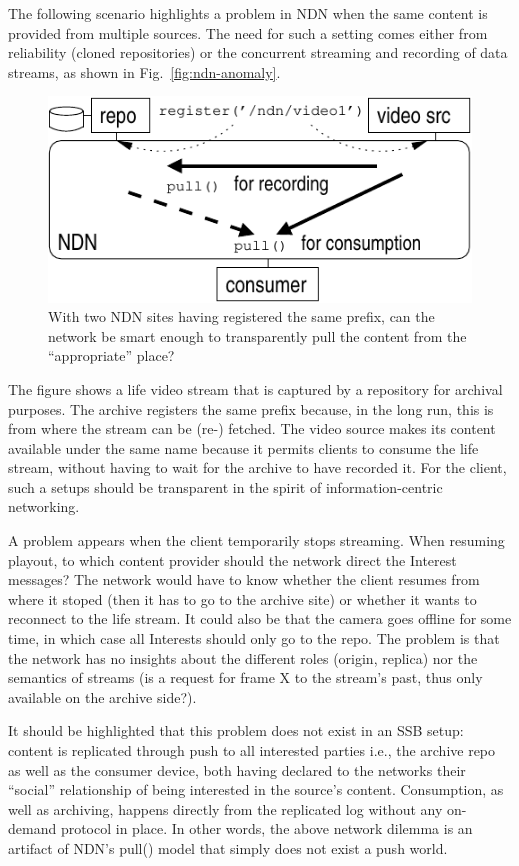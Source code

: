 \documentclass[10pt,sigconf]{acmart}
\begin{document}
The following scenario highlights a problem in NDN when the same
content is provided from multiple sources. The need for such a setting
comes either from reliability (cloned repositories) or the concurrent
streaming and recording of data streams, as shown in
Fig.~\ref{fig:ndn-anomaly}.

\begin{figure}[htb]
  \includegraphics[width=0.7\columnwidth]{figs/ndn-anomaly.pdf}
  \caption{\label{fig:ssb-and-ndn}With two NDN sites having registered
    the same prefix, can the network be smart enough to transparently
    pull the content from the ``appropriate'' place?}
\end{figure}

The figure shows a life video stream that is captured by a repository
for archival purposes. The archive registers the same prefix because,
in the long run, this is from where the stream can be (re-)
fetched. The video source makes its content available under the same
name because it permits clients to consume the life stream, without
having to wait for the archive to have recorded it. For the client,
such a setups should be transparent in the spirit of
information-centric networking.

A problem appears when the client temporarily stops streaming. When
resuming playout, to which content provider should the network direct
the Interest messages? The network would have to know whether the
client resumes from where it stoped (then it has to go to the archive
site) or whether it wants to reconnect to the life stream. It could
also be that the camera goes offline for some time, in which case all
Interests should only go to the repo. The problem is that the network
has no insights about the different roles (origin, replica) nor the
semantics of streams (is a request for frame X to the stream's past,
thus only available on the archive side?).

It should be highlighted that this problem does not exist in an SSB
setup: content is replicated through push to all interested parties
i.e., the archive repo as well as the consumer device, both having
declared to the networks their ``social'' relationship of being
interested in the source's content. Consumption, as well as archiving,
happens directly from the replicated log without any on-demand
protocol in place. In other words, the above network dilemma is an
artifact of NDN's pull() model that simply does not exist a push
world.
\end{document}
